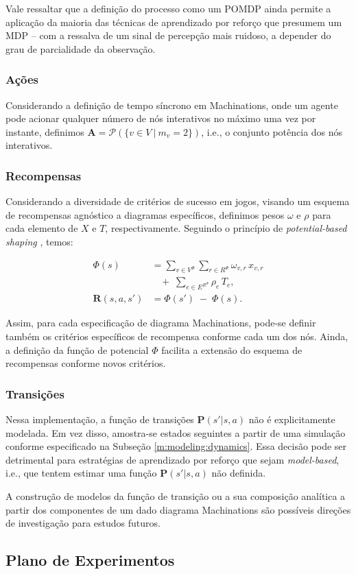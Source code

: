 \documentclass[10pt,a4paper]{article}
\newcommand{\A}{\mathbf{A}}
\newcommand{\R}{\mathbf{R}}
\newcommand{\Ptr}{\mathbf{P}}
\begin{document}
Vale ressaltar que a definição do processo como um POMDP ainda permite a aplicação da maioria das técnicas de aprendizado por reforço que presumem um MDP -- com a ressalva de um sinal de percepção mais ruidoso, a depender do grau de parcialidade da observação.

\subsubsection{Ações}
\label{m:mdp:actions}
Considerando a definição de tempo síncrono em Machinations, onde um agente pode acionar qualquer número de nós interativos no máximo uma vez por instante, definimos $\A = \mathcal{P}(\{ v \in V \ | \ m_v = 2\})$, i.e., o conjunto potência dos nós interativos.

\subsubsection{Recompensas}
\label{m:mdp:rewards}
Considerando a diversidade de critérios de sucesso em jogos, visando um esquema de recompensas agnóstico a diagramas específicos, definimos pesos $\omega$ e $\rho$ para cada elemento de $X$ e $T$, respectivamente. Seguindo o princípio de \textit{potential-based shaping} \parencite{potential-rl}, temos:

\begin{align*}
    \Phi(s) &= \sum_{v\in V^{\Phi}}\sum_{r \in R^{\Phi}}\omega_{v,r}\,x_{v,r}\\
          &\ \ \ \ +\;\sum_{e\in E^{R^{\Phi}}}\rho_{e}\,T_{e},\\
\R(s,a,s') &= \Phi(s') \;-\; \Phi(s).
\end{align*}

Assim, para cada especificação de diagrama Machinations, pode-se definir também os critérios específicos de recompensa conforme cada um dos nós. Ainda, a definição da função de potencial $\Phi$ facilita a extensão do esquema de recompensas conforme novos critérios.

\subsubsection{Transições}
\label{m:mdp:transitions}
Nessa implementação, a função de transições $\Ptr (s' | s, a)$ não é explicitamente modelada. Em vez disso, amostra-se estados seguintes a partir de uma simulação conforme especificado na Subseção \ref{m:modeling:dynamics}. Essa decisão pode ser detrimental para estratégias de aprendizado por reforço que sejam \textit{model-based}, i.e., que tentem estimar uma função $\Ptr (s' | s, a)$ não definida.

A construção de modelos da função de transição ou a sua composição analítica a partir dos componentes de um dado diagrama Machinations são possíveis direções de investigação para estudos futuros.

\subsection{Plano de Experimentos}
\label{m:experiments}

\printbibliography
\end{document}
